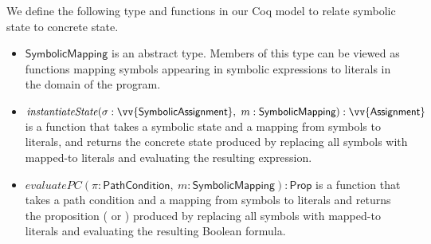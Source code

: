 We define the following type and functions in our Coq model to relate symbolic
state to concrete state. 

\begin{itemize}
\item $\textsf{SymbolicMapping}$ is an abstract type. Members of this type
  can be viewed as functions mapping symbols appearing in symbolic expressions to literals
  in the domain of the program.
\item $\mathit{instantiateState}(\sigma: \vv{\textsf{SymbolicAssignment}},~
    m: \textsf{SymbolicMapping}) : \vv{\textsf{Assignment}}$ is a function that takes a symbolic state and a mapping from symbols to literals, and
returns the concrete state produced by replacing all symbols with mapped-to
literals and evaluating the resulting expression.
\item $\mathit{evaluatePC}(\pi : \textsf{PathCondition},~m:
  \textsf{SymbolicMapping}) : \textsf{Prop}$ is a function that takes a path
  condition and a mapping from symbols to literals and returns the proposition
  (\texttrue{} or \textfalse) produced by replacing all symbols with mapped-to
  literals and evaluating the resulting Boolean formula.
\end{itemize}



